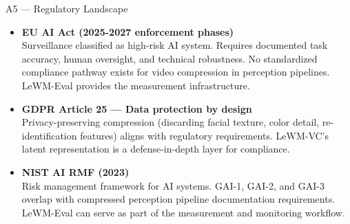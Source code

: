 \documentclass[aspectratio=169, professionalfonts, 10pt]{beamer}
\begin{document}
\begin{frame}{A5 --- Regulatory Landscape}

  \begin{itemize}
    \item \textbf{EU AI Act (2025-2027 enforcement phases)} \\
          Surveillance classified as high-risk AI system.
          Requires documented task accuracy, human oversight,
          and technical robustness. No standardized compliance pathway
          exists for video compression in perception pipelines.
          LeWM-Eval provides the measurement infrastructure.

    \bigskip
    \item \textbf{GDPR Article 25 --- Data protection by design} \\
          Privacy-preserving compression (discarding facial texture,
          color detail, re-identification features) aligns with
          regulatory requirements. LeWM-VC's latent representation
          is a defense-in-depth layer for compliance.

    \bigskip
    \item \textbf{NIST AI RMF (2023)} \\
          Risk management framework for AI systems. GAI-1, GAI-2,
          and GAI-3 overlap with compressed perception pipeline
          documentation requirements. LeWM-Eval can serve as part
          of the measurement and monitoring workflow.
  \end{itemize}
\end{frame}
\end{document}
